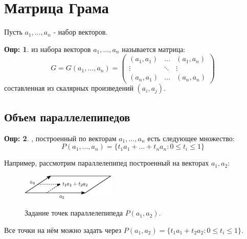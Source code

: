 \documentclass[12pt]{article}
\theoremstyle{definition}
\newtheorem{defn}{Опр:}
\begin{document}
\section*{Матрица Грама}
Пусть $a_1, \dotsc, a_n$ - набор векторов.
\begin{defn}
	 из набора векторов $a_1, \dotsc, a_n$ называется матрица: 
	$$
		G = G(a_1, \dotsc, a_n) = 
		\begin{pmatrix}
			(a_1,a_1) & \dotsc & (a_1, a_n) \\
			\vdots & \ddots & \vdots \\
			(a_n, a_1) & \dotsc & (a_n, a_n)
		\end{pmatrix}
	$$
	составленная из скалярных произведений $(a_i, a_j)$.
\end{defn}
\subsection*{Объем параллелепипедов}
\begin{defn}
	, построенный по векторам $a_1, \dotsc, a_n$ есть следующее множество:
	$$
		P(a_1, \dotsc, a_n) = \{t_1 a_1 + \dotsc + t_n a_n \colon 0 \leq t_i \leq 1\}
	$$
\end{defn}
Например, рассмотрим параллелепипед построенный на векторах $a_1, a_2$:
\begin{figure}[H]
	\centering
	\includegraphics[width=0.4\textwidth]{7_3.eps}
	\label{7_3}
	\caption{Задание точек параллелепипеда $P(a_1,a_2)$.}
	\label{fig:Задание точек параллелепипеда}
\end{figure}
Все точки на нём можно задать через $P(a_1,a_2) = \{t_1 a_1 + t_2 a_2 \colon 0 \leq t_i \leq 1\}$.
\end{document}
